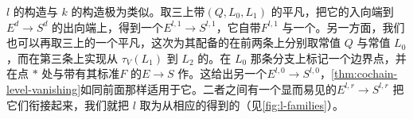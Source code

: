 $l$ 的构造与 $k$ 的构造极为类似。取三\trPointedDisc{}上带\trBoundaryCondition{}$(Q,L_0,L_1)$ 的平凡\trFibration，把它的入向端\trGluing{}到 $E^d\to S^d$ 的出向端上，得到一个\trFibration{}$E^{l,1}\to S^{l,1}$，它自带\trBoundaryCondition{}$F^{l,1}$ 与一个\trRelative\trPerturbationDatum。另一方面，我们也可以再取三\trPointedDisc{}上的一个平凡\trFibration，这次为其配备的\trBoundaryCondition{}在前两条\trBoundaryComponent{}上分别取常值 $Q$ 与常值 $L_0$，而在第三条上实现从 $\tau_V(L_1)$ 到 $L_2$ 的\trIsotopy。在 $L_0$ 那条分支上标记一个边界点，并在点 $\ast$ 处与带有其标准\trBoundaryCondition{}$F$ 的\trFibration{}$E\to S$ 作\trBoundaryConnectedSum。这给出另一个\trFibration{}$E^{l,0}\to S^{l,0}$，\cref{thm:cochain-level-vanishing}如同前面那样适用于它。二者之间有一个显而易见的\trFamily{}$E^{l,r}\to S^{l,r}$ 把它们衔接起来，我们就把 $l$ 取为从相应的\trParametrization{}\trModuliSpace{}得到的\trInvariant（见\cref{fig:l-families}）。
